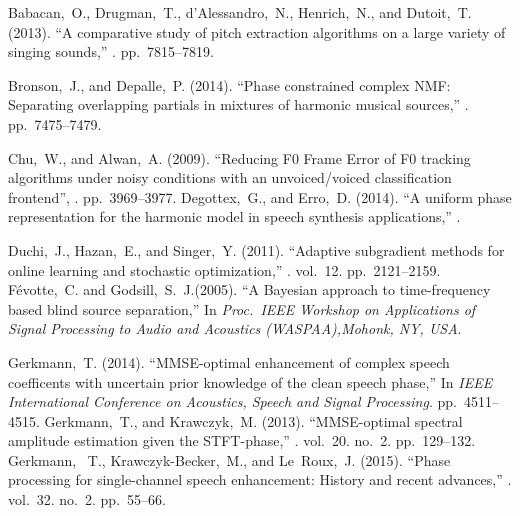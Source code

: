 %  
 Babacan,~O., Drugman,~T., d'Alessandro,~N., Henrich,~N., and Dutoit,~T. (2013).
\newblock ``A comparative study of pitch extraction algorithms on a large variety of singing sounds,'' . pp.~7815--7819.

 Bronson,~J., and Depalle,~P. (2014).
\newblock ``Phase constrained complex NMF: Separating overlapping partials in mixtures of harmonic musical sources,'' . pp.~7475--7479.


 Chu,~W., and Alwan,~A. (2009). \newblock ``Reducing
F0 Frame Error of F0 tracking algorithms under noisy conditions with an
unvoiced/voiced classification frontend'', . pp.~3969--3977.
 Degottex,~G., and Erro,~D. (2014).
\newblock ``A uniform phase representation for the harmonic model in speech
synthesis applications,'' .

 Duchi,~J., Hazan,~E., and Singer,~Y. (2011).
\newblock ``Adaptive subgradient methods for online learning and stochastic
optimization,'' . vol.~12. pp.~2121--2159.
%
 Févotte,~C. and Godsill,~S.~J.(2005). \newblock
``A Bayesian approach to time-frequency based blind source separation,'' \newblock In
{\em Proc.~IEEE Workshop on Applications of Signal Processing to Audio and Acoustics (WASPAA),Mohonk, NY, USA}.

 Gerkmann,~T. (2014). \newblock ``{MMSE}-optimal
enhancement of complex speech coefficents with uncertain prior knowledge of the
clean speech phase,'' \newblock In {\em IEEE International Conference on
Acoustics, Speech and Signal Processing}. pp.~4511--4515.
%
 Gerkmann,~T., and Krawczyk,~M. (2013).
\newblock ``{MMSE}-optimal spectral amplitude estimation given the {STFT}-phase,''
. vol.~20. no.~2. pp.~129--132.
% 
 Gerkmann, ~T., Krawczyk-Becker,~M., and
Le~Roux,~J. (2015). \newblock ``Phase processing for single-channel speech enhancement:
History and recent advances,'' .
vol.~32. no.~2. pp.~55--66.

